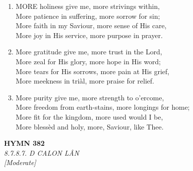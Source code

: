\begin{enumerate}
    \item MORE holiness give me, more strivings within, \\
        More patience in suffering, more sorrow for sin; \\
        More faith in my Saviour, more sense of His care, \\
        More joy in His service, more purpose in prayer.

    \item More gratitude give me, more trust in the Lord, \\
        More zeal for His glory, more hope in His word; \\
        More tears for His sorrows, more pain at His grief, \\
        More meekness in tri\`al, more praise for relief.

    \item More purity give me, more strength to o'ercome, \\
        More freedom from earth-stains, more longings for home; \\
        More fit for the kingdom, more used would I be, \\
        More bless\`ed and holy, more, Saviour, like Thee.

\end{enumerate}

\newpage
\begin{center}
    {\Large \textbf{HYMN 382}}
    \\
    \textit{8.7.8.7. D CALON L\^{A}N}
    \\
    \textit{\small [Moderate]}
\end{center}
\vspace{1em}

